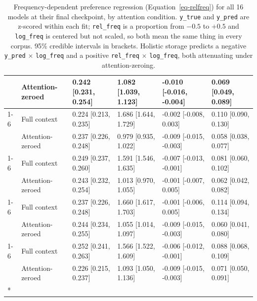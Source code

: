 \documentclass[11pt]{article}
\begin{document}
\begin{longtable}[t]{llllll}
\nopagebreak
\multirow{-2}{*}{\raggedright\arraybackslash OLMo-7B} & Attention-zeroed & 0.242 [0.231, 0.254] & 1.082 [1.039, 1.123] & -0.010 [-0.016, -0.004] & 0.069 [0.049, 0.089]\\
\cmidrule{1-6}\pagebreak[0]
 & Full context & 0.224 [0.213, 0.235] & 1.686 [1.644, 1.729] & -0.002 [-0.008, 0.003] & 0.110 [0.090, 0.130]\\
\nopagebreak
\multirow{-2}{*}{\raggedright\arraybackslash OLMo-2-1B} & Attention-zeroed & 0.237 [0.226, 0.248] & 0.979 [0.935, 1.022] & -0.009 [-0.015, -0.003] & 0.058 [0.038, 0.077]\\
\cmidrule{1-6}\pagebreak[0]
 & Full context & 0.249 [0.237, 0.260] & 1.591 [1.546, 1.635] & -0.007 [-0.013, -0.001] & 0.081 [0.060, 0.102]\\
\nopagebreak
\multirow{-2}{*}{\raggedright\arraybackslash OLMo-2-7B} & Attention-zeroed & 0.243 [0.232, 0.254] & 1.013 [0.970, 1.055] & -0.001 [-0.007, 0.005] & 0.062 [0.042, 0.082]\\
\cmidrule{1-6}\pagebreak[0]
 & Full context & 0.237 [0.226, 0.248] & 1.660 [1.617, 1.703] & -0.001 [-0.006, 0.005] & 0.114 [0.094, 0.134]\\
\nopagebreak
\multirow{-2}{*}{\raggedright\arraybackslash Llama-1.3B} & Attention-zeroed & 0.244 [0.234, 0.255] & 1.055 [1.014, 1.097] & -0.009 [-0.015, -0.003] & 0.060 [0.041, 0.080]\\
\cmidrule{1-6}\pagebreak[0]
 & Full context & 0.252 [0.241, 0.263] & 1.566 [1.522, 1.609] & -0.006 [-0.012, -0.001] & 0.088 [0.068, 0.109]\\
\nopagebreak
\multirow{-2}{*}{\raggedright\arraybackslash Llama-3-8B} & Attention-zeroed & 0.226 [0.215, 0.237] & 1.093 [1.050, 1.136] & -0.009 [-0.015, -0.003] & 0.071 [0.050, 0.091]\\*
\bottomrule


\caption{\label{tbl-relfreq}Frequency-dependent preference regression
(Equation~\ref{eq-relfreq}) for all 16 models at their final checkpoint,
by attention condition. \texttt{y\_true} and \texttt{y\_pred} are
z-scored within each fit; \texttt{rel\_freq} is a proportion from
\(-0.5\) to \(+0.5\) and \texttt{log\_freq} is centered but not scaled,
so both mean the same thing in every corpus. 95\% credible intervals in
brackets. Holistic storage predicts a negative \texttt{y\_pred}
\(\times\) \texttt{log\_freq} and a positive \texttt{rel\_freq}
\(\times\) \texttt{log\_freq}, both attenuating under
attention-zeroing.}

\tabularnewline
\end{longtable}
\end{document}
